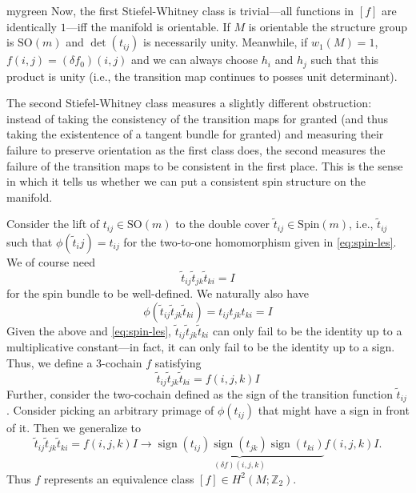 \documentclass{report}
\DeclareMathOperator{\sign}{sign}
\begin{document}
\begin{barbox}{mygreen}
	Now, the first Stiefel-Whitney class is trivial---all functions in $ [f] $ 
	are identically $ 1 $---iff the manifold is orientable. If $ M $ is orientable 
	the structure group is $ \text{SO}(m) $ and $ \det(t_{ij}) $ is necessarily
	unity. Meanwhile, if $ w_1(M) = 1 $, $ f(i,j) = (\delta f_0)(i,j) $ and we can 
	always choose $ h_i $ and $ h_j $ such that this product is unity (i.e., the 
	transition map continues to posses unit determinant).
\end{barbox}

 The second Stiefel-Whitney class measures a slightly different obstruction: instead 
of taking the consistency of the transition maps for granted (and thus taking
the existentence of a tangent bundle for granted) and measuring their 
failure to preserve orientation as the first class does, the second measures the
failure of the transition maps to be consistent in the first place.
This is the sense in which it tells us whether we can put a consistent spin 
structure on the manifold. 

Consider the lift of $ t_{ij}\in \text{SO}(m) $ to
the double cover $ \tilde{t}_{ij} \in \text{Spin}(m)$, i.e., $ \tilde{t}_{ij} $
such that $ \phi(\tilde{t}_ij) = t_{ij}$ for the two-to-one homomorphism given
in \cref{eq:spin-les}. We of course need 
\begin{equation*}
	\tilde{t}_{ij}\tilde{t}_{jk}\tilde{t}_{ki} = I
\end{equation*}
for the spin bundle to be well-defined. We naturally also have 
\begin{equation*}
	\phi(\tilde{t}_{ij}\tilde{t}_{jk}\tilde{t}_{ki}) 
	= t_{ij} t_{jk} t_{ki}
	= I
\end{equation*}
Given the above and \cref{eq:spin-les}, $ \tilde{t}_{ij}\tilde{t}_{jk}\tilde{t}_{ki} $ 
can only fail to be the identity up to a multiplicative constant---in fact, it 
can only fail to be the identity up to a sign. Thus, we define 
a 3-cochain $ f $ satisfying
\begin{equation*}
	\tilde{t}_{ij}\tilde{t}_{jk}\tilde{t}_{ki}
		= f(i,j,k)I
\end{equation*}
Further, consider the two-cochain defined as the sign of the transition 
function $ \tilde{t}_{ij} $. Consider picking an arbitrary primage of $ \phi(t_{ij}) $
that might have a sign in front of it. Then we generalize to 
\begin{equation*}
	\tilde{t}_{ij}\tilde{t}_{jk}\tilde{t}_{ki}
	= f(i,j,k) I 
	\to 
	\underbrace{\sign(t_{ij})\sign(t_{jk})\sign(t_{ki})}_{(\delta f)(i,j,k)}
		f(i,j,k) I.
\end{equation*}
Thus $ f $ represents an equivalence class $ [f] \in H^2(M; \mathbb{Z}_2) $.
\end{document}
